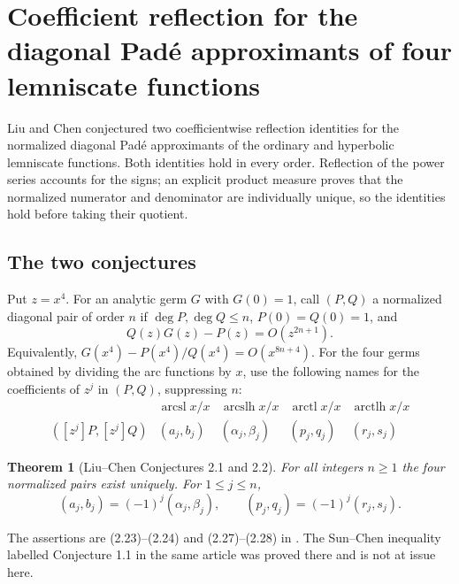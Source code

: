 \documentclass[11pt,a4paper]{article}
\numberwithin{equation}{section}
\newtheorem{theorem}{Theorem}[section]
\theoremstyle{definition}
\theoremstyle{remark}
\newenvironment{sectionabstract}{\par\smallskip\begingroup\small\noindent}{\par\endgroup\medskip}
\begin{document}
\begingroup
\newcommand{\slm}{\operatorname{arcsl}}
\newcommand{\slh}{\operatorname{arcslh}}
\newcommand{\tlm}{\operatorname{arctl}}
\newcommand{\tlh}{\operatorname{arctlh}}
\newcommand{\E}{\mathbb E}
\section{\texorpdfstring{Coefficient reflection for the diagonal Pad\'e approximants of four lemniscate functions}{Coefficient reflection for the diagonal Pad\'e approximants of four lemniscate functions}}\label{section:r28taisho}
\par\medskip

\begin{sectionabstract}
Liu and Chen conjectured two coefficientwise reflection identities for the normalized diagonal Pad\'e approximants of the ordinary and hyperbolic lemniscate functions. Both identities hold in every order. Reflection of the power series accounts for the signs; an explicit product measure proves that the normalized numerator and denominator are individually unique, so the identities hold before taking their quotient.
\end{sectionabstract}
\subsection{The two conjectures}
Put $z=x^4$. For an analytic germ $G$ with $G(0)=1$, call $(P,Q)$ a normalized diagonal pair of order $n$ if $\deg P,\deg Q\le n$, $P(0)=Q(0)=1$, and
\[
Q(z)G(z)-P(z)=O(z^{2n+1}).
\]
Equivalently, $G(x^4)-P(x^4)/Q(x^4)=O(x^{8n+4})$. For the four germs obtained by dividing the arc functions by $x$, use the following names for the coefficients of $z^j$ in $(P,Q)$, suppressing $n$:
\[
\begin{array}{c|cccc}
 &\slm x/x &\slh x/x &\tlm x/x &\tlh x/x\\\hline
 ([z^j]P,[z^j]Q)&(a_j,b_j)&(\alpha_j,\beta_j)&(p_j,q_j)&(r_j,s_j)
\end{array}
\]
\begin{theorem}[Liu--Chen Conjectures 2.1 and 2.2]
For all integers $n\ge1$ the four normalized pairs exist uniquely. For $1\le j\le n$,
\[
(a_j,b_j)=(-1)^j(\alpha_j,\beta_j),
\qquad (p_j,q_j)=(-1)^j(r_j,s_j).
\]
\end{theorem}
The assertions are (2.23)--(2.24) and (2.27)--(2.28) in \cite{r28taisho:LC}. The Sun--Chen inequality labelled Conjecture 1.1 in the same article was proved there and is not at issue here.
\end{document}

